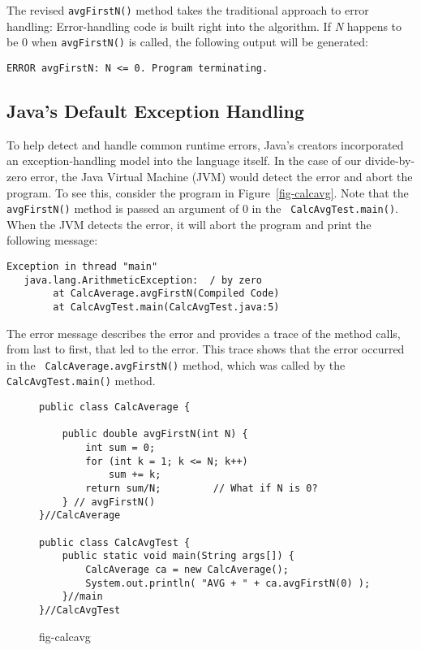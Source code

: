 \noindent The revised {\tt avgFirstN()} method takes the traditional 
approach to error handling: Error-handling code is built right into
the algorithm.  If {\it N} happens to be 0 when {\tt avgFirstN()} is
called, the following output will be generated:

\begin{jjjlisting}
\begin{lstlisting}
ERROR avgFirstN: N <= 0. Program terminating.
\end{lstlisting}
\end{jjjlisting}

\subsection{Java's Default Exception Handling}
\noindent To help detect and handle common runtime errors, Java's creators
incorporated an exception-handling model into the language
itself. In the case of our divide-by-zero error, the Java Virtual
Machine (JVM) would detect the error and abort the program. To
see this, consider the program in Figure~\ref{fig-calcavg}. Note that
the {\tt avgFirstN()} method is passed an argument of 0 in the {\tt
CalcAvgTest.main()}.  When the JVM detects the error, it will abort
the program and print the following message:

\begin{jjjlisting}
\begin{lstlisting}
Exception in thread "main" 
   java.lang.ArithmeticException:  / by zero
        at CalcAverage.avgFirstN(Compiled Code)
        at CalcAvgTest.main(CalcAvgTest.java:5)
\end{lstlisting}
\end{jjjlisting}

\noindent The error message describes the error and
provides a trace of the method calls, from last to first, that led to
the error.  This trace shows that the error occurred in the {\tt
CalcAverage.avgFirstN()} method, which was called by the {\tt
CalcAvgTest.main()} method.

\begin{figure}[tb]
\jjjprogstart
\begin{jjjlisting}
\begin{lstlisting}
public class CalcAverage {

    public double avgFirstN(int N) {
        int sum = 0;
        for (int k = 1; k <= N; k++)
            sum += k;
        return sum/N;         // What if N is 0?
    } // avgFirstN()
}//CalcAverage

public class CalcAvgTest {
    public static void main(String args[]) {
        CalcAverage ca = new CalcAverage();
        System.out.println( "AVG + " + ca.avgFirstN(0) );        
    }//main
}//CalcAvgTest
\end{lstlisting}
\end{jjjlisting}
{fig-calcavg}
\end{figure}

